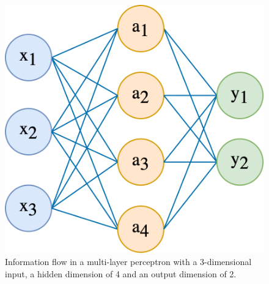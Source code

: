 \begin{figure}
    \centering
    \includegraphics[scale=0.75]{masters-report/figures/mlp.png}
    \caption{Information flow in a multi-layer perceptron with a 3-dimensional input, a hidden dimension of 4 and an output dimension of 2.}
    \label{mlp}
\end{figure}
